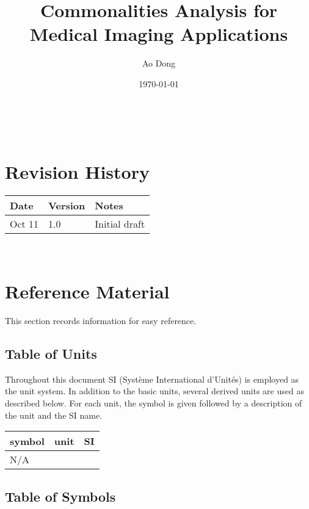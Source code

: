 \documentclass[12pt]{article}
\begin{document}
\title{Commonalities Analysis for Medical Imaging Applications} 
\author{Ao Dong}
\date{\today}

\maketitle

~\newpage


\section{Revision History}

\begin{tabularx}{\textwidth}{p{3cm}p{2cm}X}
\toprule {\bf Date} & {\bf Version} & {\bf Notes}\\
\midrule
Oct 11 & 1.0 & Initial draft\\
\bottomrule
\end{tabularx}

~\newpage
	
\section{Reference Material}

This section records information for easy reference.

\subsection{Table of Units}

Throughout this document SI (Syst\`{e}me International d'Unit\'{e}s) is employed
as the unit system.  In addition to the basic units, several derived units are
used as described below.  For each unit, the symbol is given followed by a
description of the unit and the SI name.
~\newline

\renewcommand{\arraystretch}{1.2}
  \noindent \begin{tabular}{l l l} 
    \toprule		
    \textbf{symbol} & \textbf{unit} & \textbf{SI}\\
    \midrule 
    N/A\\
    \bottomrule
  \end{tabular}

\subsection{Table of Symbols}
\end{document}
